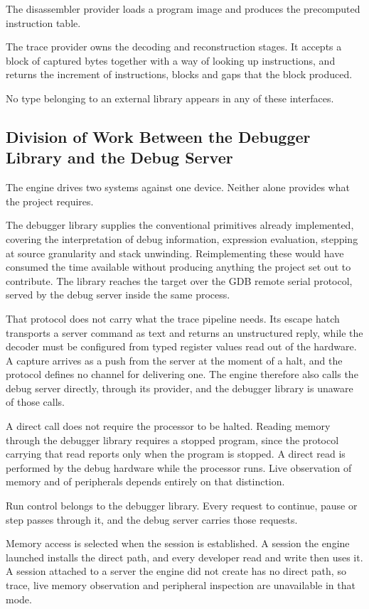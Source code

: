 The disassembler provider loads a program image and produces the precomputed instruction table.

The trace provider owns the decoding and reconstruction stages. It accepts a block of captured bytes together with a way of looking up instructions, and returns the increment of instructions, blocks and gaps that the block produced.

No type belonging to an external library appears in any of these interfaces.

\subsection{Division of Work Between the Debugger Library and the Debug Server}
\label{subsec:division}
The engine drives two systems against one device. Neither alone provides what the project requires.

The debugger library supplies the conventional primitives already implemented, covering the interpretation of debug information, expression evaluation, stepping at source granularity and stack unwinding. Reimplementing these would have consumed the time available without producing anything the project set out to contribute. The library reaches the target over the GDB remote serial protocol, served by the debug server inside the same process.

That protocol does not carry what the trace pipeline needs. Its escape hatch transports a server command as text and returns an unstructured reply, while the decoder must be configured from typed register values read out of the hardware. A capture arrives as a push from the server at the moment of a halt, and the protocol defines no channel for delivering one. The engine therefore also calls the debug server directly, through its provider, and the debugger library is unaware of those calls.

A direct call does not require the processor to be halted. Reading memory through the debugger library requires a stopped program, since the protocol carrying that read reports only when the program is stopped. A direct read is performed by the debug hardware while the processor runs. Live observation of memory and of peripherals depends entirely on that distinction.

Run control belongs to the debugger library. Every request to continue, pause or step passes through it, and the debug server carries those requests.

Memory access is selected when the session is established. A session the engine launched installs the direct path, and every developer read and write then uses it. A session attached to a server the engine did not create has no direct path, so trace, live memory observation and peripheral inspection are unavailable in that mode.


